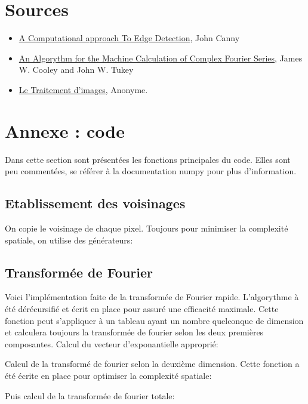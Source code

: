 \documentclass{article}
\begin{document}
\section{Sources}
\begin{itemize}
	\item \href{https://github.com/Involture/fuuusion/tree/master/sourcedocs/Traitement_dimages/Canny.pdf}{A Computational approach To Edge Detection}, John Canny
	\item \href{https://github.com/Involture/fuuusion/tree/master/sourcedocs/Traitement_dimages/ComplexFourierSerieAlgo.pdf}{An Algorythm for the Machine Calculation of Complex Fourier Series}, James W. Cooley and John W. Tukey
	\item \href{https://github.com/Involture/fuuusion/tree/master/sourcedocs/Traitement_dimages/traitement_image/traitement_image.html}{Le Traitement d'images}, Anonyme.
\end{itemize}

\pagebreak

\appendix

\section{Annexe : code}

Dans cette section sont présentées les fonctions principales du code. Elles sont peu commentées, se référer à la documentation numpy pour plus d'information.

\subsection{Etablissement des voisinages}\label{vois}

On copie le voisinage de chaque pixel. Toujours pour minimiser la complexité spatiale, on utilise des générateurs:


\subsection{Transformée de Fourier}\label{four}

Voici l'implémentation faite de la transformée de Fourier rapide. L'algorythme à été dérécursifié et écrit en place pour assuré une efficacité maximale. Cette fonction peut s'appliquer à un tableau ayant un nombre quelconque de dimension et calculera toujours la transformée de fourier selon les deux premières composantes.
Calcul du vecteur d'exponantielle approprié:

Calcul de la transformé de fourier selon la deuxième dimension. Cette fonction a été écrite en place pour optimiser la complexité spatiale:

Puis calcul de la transformée de fourier totale:

\end{document}
